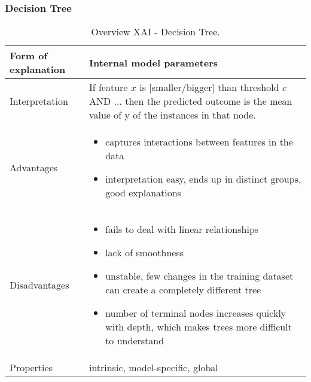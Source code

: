\subsubsection{Decision Tree}
\begin{table}[H]
  \centering
  \begin{tabular}{|p{}|p{}|}
    \hline
    Form of \newline explanation & 
    Internal model parameters \\
    
    \hline
    Interpretation & 
    If feature $x$ is [smaller/bigger] than threshold $c$ AND $\dots$ then the predicted outcome is the mean value of y of the instances in that node. \\
 
    \hline
    Advantages &
    \begin{itemize}[nosep, left=0em]
        \item captures interactions between features in the data
        \item interpretation easy, ends up in distinct groups, good explanations
    \end{itemize} \\
    
    \hline
    Disadvantages &
    \begin{itemize}[nosep, left=0em]
        \item fails to deal with linear relationships
        \item lack of smoothness
        \item unstable, few changes in the training dataset can create a completely different tree
        \item number of terminal nodes increases quickly with depth, which makes trees more difficult to understand
    \end{itemize} \\
    
    \hline
    Properties & 
    intrinsic, model-specific, global  \\
    
    \hline
  \end{tabular}
  \caption{Overview XAI - Decision Tree.}
  \label{tab:Tree}
\end{table}

